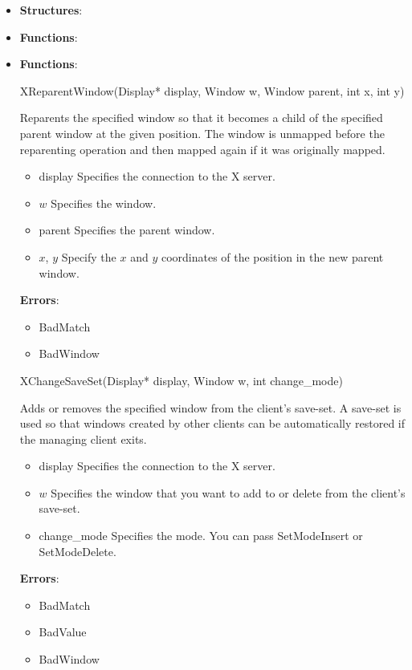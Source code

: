 \documentclass{report}
\begin{document}
    \pagebreak 
    \begin{itemize}
        \item \textbf{Structures}:
        \item \textbf{Functions}:
    \end{itemize}

    \pagebreak 
    \begin{itemize}
    \item \textbf{Functions}:
        \begin{cppcode}
        XReparentWindow(Display* display, Window w, Window parent, int x, int y)
        \end{cppcode}
        \bigbreak \noindent
        Reparents the specified window so that it becomes a child of the specified parent window at the given position. The window is unmapped before the reparenting operation and then mapped again if it was originally mapped.
        \begin{itemize}
            \item display Specifies the connection to the X server.
            \item $w$ Specifies the window.
            \item parent Specifies the parent window.
            \item $x$, $y$ Specify the $x$ and $y$ coordinates of the position in the new parent window.
        \end{itemize}
        \bigbreak \noindent
        \textbf{Errors}:
        \begin{itemize}
            \item BadMatch
            \item BadWindow
        \end{itemize}

        \begin{cppcode}
            XChangeSaveSet(Display* display, Window w, int change_mode)
        \end{cppcode}
        \bigbreak \noindent
        Adds or removes the specified window from the client’s save-set. A save-set is used so that windows created by other clients can be automatically restored if the managing client exits.
        \begin{itemize}
            \item display Specifies the connection to the X server.
            \item $w$ Specifies the window that you want to add to or delete from the client’s save-set.
            \item change\_mode Specifies the mode. You can pass SetModeInsert or SetModeDelete.
        \end{itemize}
        \bigbreak \noindent
        \textbf{Errors}:
        \begin{itemize}
            \item BadMatch
            \item BadValue
            \item BadWindow
        \end{itemize}


\end{itemize}
\end{document}

